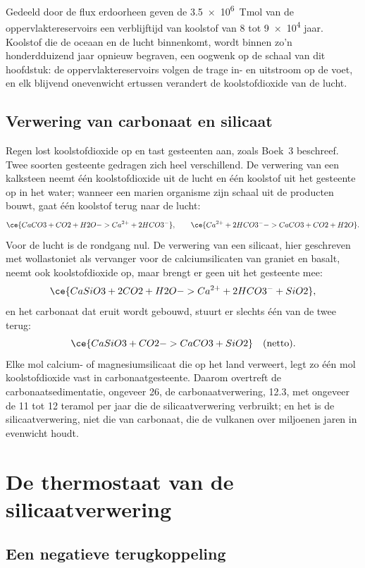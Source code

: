 Gedeeld door de flux erdoorheen geven de \qty{3.5e6}{Tmol} van de oppervlaktereservoirs een
verblijftijd van koolstof van 8 tot \num{9e4} jaar. Koolstof die de oceaan en de lucht binnenkomt, wordt
binnen zo'n honderdduizend jaar opnieuw begraven, een oogwenk op de schaal van dit hoofdstuk: de
oppervlaktereservoirs volgen de trage in- en uitstroom op de voet, en elk blijvend onevenwicht ertussen
verandert de koolstofdioxide van de lucht.

\subsection*{Verwering van carbonaat en silicaat}

Regen lost koolstofdioxide op en tast gesteenten aan, zoals Boek~3 beschreef. Twee soorten gesteente
gedragen zich heel verschillend. De verwering van een kalksteen neemt één koolstofdioxide uit de lucht en één
koolstof uit het gesteente op in het water; wanneer een marien organisme zijn schaal uit de producten bouwt,
gaat één koolstof terug naar de lucht:
\[
  \ce{CaCO3 + CO2 + H2O -> Ca^{2+} + 2 HCO3^-} , \qquad
  \ce{Ca^{2+} + 2 HCO3^- -> CaCO3 + CO2 + H2O} .
\]
Voor de lucht is de rondgang nul. De verwering van een silicaat, hier geschreven met wollastoniet als
vervanger voor de calciumsilicaten van graniet en basalt, neemt ook koolstofdioxide op, maar brengt
er geen uit het gesteente mee:
\[
  \ce{CaSiO3 + 2 CO2 + H2O -> Ca^{2+} + 2 HCO3^- + SiO2} ,
\]
en het carbonaat dat eruit wordt gebouwd, stuurt er slechts één van de twee terug:
\[
  \ce{CaSiO3 + CO2 -> CaCO3 + SiO2} \quad\text{(netto)} .
\]
Elke mol calcium- of magnesiumsilicaat die op het land verweert, legt zo één mol koolstofdioxide
vast in carbonaatgesteente. Daarom overtreft de carbonaatsedimentatie, ongeveer 26, de carbonaatverwering,
12.3, met ongeveer de 11 tot 12 teramol per jaar die de silicaatverwering verbruikt; en het is de
silicaatverwering, niet die van carbonaat, die de vulkanen over miljoenen jaren in evenwicht houdt.

\section{De thermostaat van de silicaatverwering}\label{sec:b2:deep-time-climate:thermostat}

\subsection*{Een negatieve terugkoppeling}

